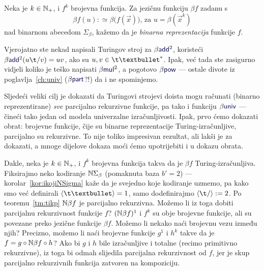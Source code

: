 \begin{definicija}[{name=[binarna reprezentacija brojevne funkcije]}]
Neka je $k\in{\mathbb N}_+$, i $f^k$ brojevna funkcija. Za jezičnu funkciju $\beta f$ zadanu s \begin{equation}\label{eq:betaf}
    \beta f(u):\simeq\beta\bigl(f(\vec x)\bigr)\text{, za } u=\beta(\vec x^k)
\end{equation}
nad binarnom abecedom $\Sigma_\beta$, kažemo da je \emph{binarna reprezentacija} funkcije $f$.
\end{definicija}

Vjerojatno ste nekad napisali Turingov stroj za $\beta\f{add}^2$, koristeći $\beta\f{add}^2(u\t/v)=uv$, ako su $u,v\in\t\textbullet^*$. Ipak, već tada ste zasigurno vidjeli koliko je teško napisati $\beta\f{mul}^2$, a pogotovo $\beta\f{pow}$ --- ostale divote iz poglavlja~\ref{ch:univ} ($\beta\f{part}$?!) da i ne spominjemo.

Sljedeći veliki cilj je dokazati da Turingovi strojevi doista mogu računati (binarno reprezentirane) \emph{sve} parcijalno rekurzivne funkcije, pa tako i funkciju $\beta\f{univ}$ --- čineći tako jedan od modela univerzalne izračunljivosti. Ipak, prvo ćemo dokazati obrat: brojevne funkcije, čije su binarne reprezentacije Turing-izračunljive, parcijalno su rekurzivne. To nije toliko impresivan rezultat, ali lakši je za dokazati, a mnoge dijelove dokaza moći ćemo upotrijebiti i u dokazu obrata.


Dakle, neka je $k\in{\mathbb N}_+$, i $f^k$ brojevna funkcija takva da je $\beta f$ Turing-izračunljiva. Fiksirajmo neko kodiranje ${\mathbb N}\Sigma_\beta$ (pomaknuta baza $b'=2$) --- korolar~\ref{kor:ikojiNSigma} kaže da je svejedno koje kodiranje uzmemo, pa kako smo već definirali $\kr{\t\textbullet}=1$, samo dodefinirajmo $\kr{\t/}:=2$.
Po teoremu~\ref{tm:tikp} ${\mathbb N}\beta f$ je parcijalno rekurzivna. Možemo li iz toga dobiti parcijalnu rekurzivnost funkcije $f$? $({\mathbb N}\beta f)^1$ i $f^k$ su obje brojevne funkcije, ali su povezane preko jezične funkcije $\beta f$. Možemo li nekako naći brojevnu vezu između njih? Precizno, možemo li naći brojevne funkcije $g^1$ i $h^k$ takve da je $f=g\circ{\mathbb N}\beta f\circ h$? Ako bi $g$ i $h$ bile izračunljive i totalne (recimo primitivno rekurzivne), iz toga bi odmah slijedila parcijalna rekurzivnost od $f$, jer je skup parcijalno rekurzivnih funkcija zatvoren na kompoziciju.

